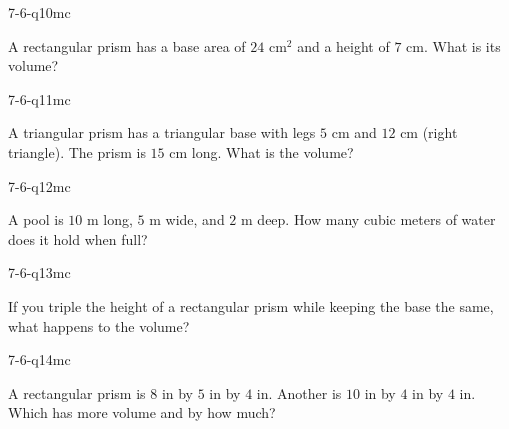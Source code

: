 \begin{practiceQuestion}{7-6-q10}{mc}
\begin{questionText}
A rectangular prism has a base area of $24$ cm$^2$ and a height of $7$ cm. What is its volume?
\end{questionText}
\end{practiceQuestion}

\begin{practiceQuestion}{7-6-q11}{mc}
\begin{questionText}
A triangular prism has a triangular base with legs $5$ cm and $12$ cm (right triangle). The prism is $15$ cm long. What is the volume?
\end{questionText}
\end{practiceQuestion}

\begin{practiceQuestion}{7-6-q12}{mc}
\begin{questionText}
A pool is $10$ m long, $5$ m wide, and $2$ m deep. How many cubic meters of water does it hold when full?
\end{questionText}
\end{practiceQuestion}

\begin{practiceQuestion}{7-6-q13}{mc}
\begin{questionText}
If you triple the height of a rectangular prism while keeping the base the same, what happens to the volume?
\end{questionText}
\end{practiceQuestion}

\begin{practiceQuestion}{7-6-q14}{mc}
\begin{questionText}
A rectangular prism is $8$ in by $5$ in by $4$ in. Another is $10$ in by $4$ in by $4$ in. Which has more volume and by how much?
\end{questionText}
\end{practiceQuestion}

